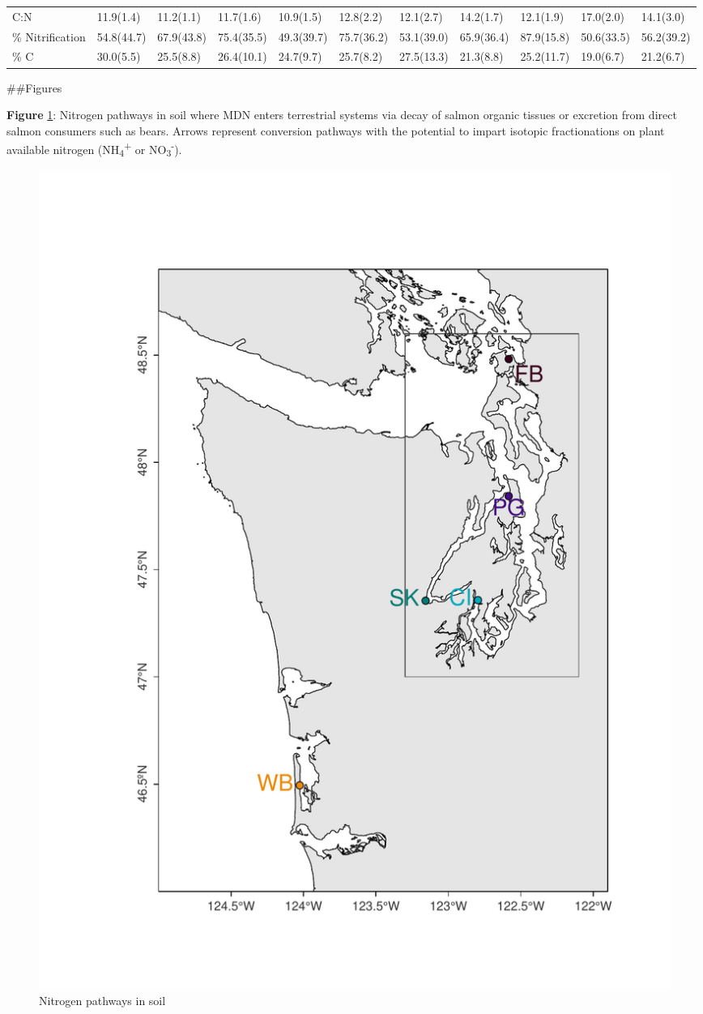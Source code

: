\documentclass [11pt, proquest] {uwthesis}[2015/03/03]
\begin{document}
\begin{landscape}
\begin{longtable}[t]{lllllllllll}
\addlinespace
C:N & 11.9(1.4) & 11.2(1.1) & 11.7(1.6) & 10.9(1.5) & 12.8(2.2) & 12.1(2.7) & 14.2(1.7) & 12.1(1.9) & 17.0(2.0) & 14.1(3.0)\\
\% Nitrification & 54.8(44.7) & 67.9(43.8) & 75.4(35.5) & 49.3(39.7) & 75.7(36.2) & 53.1(39.0) & 65.9(36.4) & 87.9(15.8) & 50.6(33.5) & 56.2(39.2)\\
\% C & 30.0(5.5) & 25.5(8.8) & 26.4(10.1) & 24.7(9.7) & 25.7(8.2) & 27.5(13.3) & 21.3(8.8) & 25.2(11.7) & 19.0(6.7) & 21.2(6.7)\\
\bottomrule
\end{longtable}
\endgroup{}


\end{landscape}
\clearpage

\#\#Figures

\textbf{Figure} \ref{fig:npathways}: Nitrogen pathways in soil where MDN enters terrestrial systems via decay of salmon organic tissues or excretion from direct salmon consumers such as bears. Arrows represent conversion pathways with the potential to impart isotopic fractionations on plant available nitrogen (NH\textsubscript{4}\textsuperscript{+} or NO\textsubscript{3}\textsuperscript{-}).\newline
\begin{figure}[h]
  \includegraphics{figure/Ch1/fig1.1.pdf}
  \caption{Nitrogen pathways in soil}
  \label{fig:npathways}
\end{figure}
\clearpage
\end{document}

